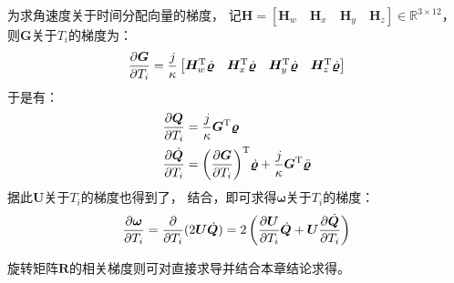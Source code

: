 为求角速度关于时间分配向量的梯度，
记$\bm{H}=\left[\bm{H}_w \quad \bm{H}_x \quad \bm{H}_y \quad \bm{H}_z\right] \in \mathbb{R}^{3\times 12}$，
则$\bm{G}$关于$T_i$的梯度为： 
\begin{equation}
    \frac{\partial{\bm{G}}}{\partial{T_i}} = 
    \frac{j}{\kappa}\begin{bmatrix}
        \bm{H}_w^{\text{T}}\dot{\bm{\varrho}} & \bm{H}_x^{\text{T}}\dot{\bm{\varrho}} & \bm{H}_y^{\text{T}}\dot{\bm{\varrho}} & \bm{H}_z^{\text{T}}\dot{\bm{\varrho}}
    \end{bmatrix} 
\end{equation}
于是有：
\begin{align}
    \frac{\partial{\bm{Q}}}{\partial{T_i}} &= \frac{j}{\kappa}{\bm{G}}^{\text{T}}\bm{\varrho} \\
    \frac{\partial{\dot{\bm{Q}}}}{\partial{T_i}} &= {\left(\frac{\partial{\bm{G}}}{\partial{T_i}}\right)}^{\text{T}}\dot{\bm{\varrho}} + \frac{j}{\kappa}{\bm{G}}^{\text{T}}\ddot{\bm{\varrho}}
\end{align}
据此$\bm{U}$关于$T_i$的梯度也得到了，
结合，即可求得$\bm{\omega}$关于$T_i$的梯度：
\begin{equation}
    \frac{\partial{\bm{\omega}}}{\partial{T_i}} = \frac{\partial{}}{\partial{T_i}}(2\bm{U}\dot{\bm{Q}}) = 2\left(\frac{\partial{\bm{U}}}{\partial{T_i}}\dot{\bm{Q}} + \bm{U}\frac{\partial{\dot{\bm{Q}}}}{\partial{T_i}}\right)
\end{equation}

旋转矩阵$\bm{R}$的相关梯度则可对直接求导并结合本章结论求得。

